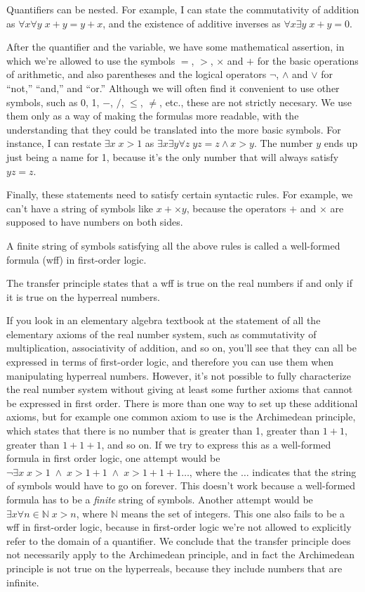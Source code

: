 Quantifiers can be nested. For example, I can state the commutativity of addition as
$\forall x \forall y \; x+y=y+x$, and the existence of additive inverses as $\forall x \exists y \; x+y=0$.

After the quantifier and the variable, we have some mathematical assertion, in which we're allowed to use the symbols
$=$, $>$, $\times$ and $+$ for the basic operations of arithmetic, and also parentheses and the logical
operators $\neg$, $\wedge$ and $\vee$ for ``not,'' ``and,'' and ``or.''
Although we will often find it convenient to use other symbols, such as 0, 1,
$-$, $/$, $\le$, $\ne$, etc., these are not strictly necesary. We use them only as a way of making the formulas more
readable, with the understanding that they could be translated into the more basic symbols.
For instance, I can restate $\exists x \; x>1$ as $\exists x \exists y \forall z \; yz=z \wedge x>y$.
The number $y$ ends up just being a name for 1, because it's the only number that will always satisfy
$yz=z$.

Finally, these statements need to satisfy certain syntactic rules. For example, we can't have a string of
symbols like $x+\times y$, because the operators $+$ and $\times$ are supposed to have numbers on both sides.

A finite string of symbols satisfying all the above rules is called a well-formed formula (wff)
in first-order logic.

The transfer principle states that a wff is true on the real numbers if and only if it is true on the hyperreal numbers.

If you look in an elementary algebra textbook at  the statement of all the elementary axioms of the real number system, such
as commutativity of multiplication, associativity of addition, and so on, you'll see that they can all
be expressed in terms of first-order logic, and therefore you can use them when manipulating hyperreal numbers.
However, it's not possible to fully characterize the real number system without giving at least some further
axioms that cannot be expressed in first order. There is more than one way to set up these additional axioms,
but for example one common axiom to use is the Archimedean principle,
which states that there is no number that is greater than 1, greater than $1+1$, greater than $1+1+1$, and so on.
If we try to express this as a well-formed formula in first order logic, one attempt would be
$\neg \exists x \; x>1 \;\wedge\; x>1+1  \;\wedge\; x>1+1+1 \ldots$, where the $\dots$ indicates that the string of
symbols would have to go on forever. This doesn't work because a well-formed formula has to be a \emph{finite}
string of symbols. Another attempt would be $\exists x \forall n \in \mathbb{N} \; x>n$, where $\mathbb{N}$ means
the set of integers. This one also fails to be a wff in first-order logic, because in first-order logic
we're not allowed to explicitly refer to the domain of a quantifier. We conclude that the transfer principle
does not necessarily apply to the Archimedean principle, and in fact the Archimedean principle is not
true on the hyperreals, because they include numbers that are infinite.

